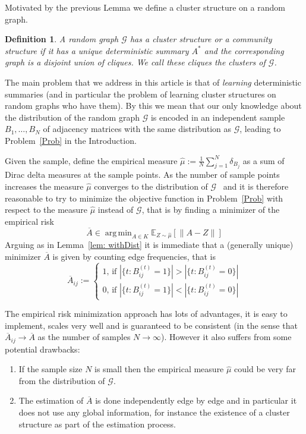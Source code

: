 \documentclass[12pt]{amsart}
\newtheorem{definition}[lemma]{Definition}
\theoremstyle{remark}
\DeclareMathOperator*{\argmin}{arg\,min}
\newcommand{\EE}{\mathbb{E}}
\newcommand{\grG}{{\mathcal{G}}}
\begin{document}
Motivated by the previous Lemma we define a cluster structure on a random graph.

\begin{definition} A random graph $\grG$ has a {\it cluster structure} or a {\it community structure} if it has a unique deterministic summary $A^*$ and the corresponding graph is a disjoint union of cliques. We call these cliques the clusters of $\grG$.
\end{definition}

The main problem that we address in this article is that of {\it learning} deterministic summaries (and in particular the problem of learning cluster structures on random graphs who have them). By this we mean that our only knowledge about the distribution of the random graph $\grG$ is encoded in an independent sample $B_1,\dots, B_N$ of adjacency matrices with the same distribution as $\grG$, leading to Problem~\ref{Prob} in the Introduction. 



Given the sample, define the empirical measure $\hat{\mu}:=\frac{1}{N}\sum_{j=1}^N \delta_{B_j}$ as a sum of Dirac delta measures at the sample points. As the number of sample points increases the measure $\hat{\mu}$ converges to the distribution of $\grG$~\cite{Fournier} and it is therefore reasonable to try to minimize the objective function in Problem~\ref{Prob} with respect to the measure $\hat{\mu}$ instead of $\grG$, that is by finding a minimizer of the empirical risk
\[\overline{A}\in\argmin _{A\in K} \EE_{Z\sim \hat{\mu}}[\|A-Z\|]\]
Arguing as in Lemma~\ref{lem: withDist} it is immediate that a (generally unique) minimizer $\overline{A}$ is given by counting edge frequencies, that is
\[ 
\overline{A}_{ij}:=\begin{cases}
1\text{, if $|\{t: B^{(t)}_{ij}=1\}|>|\{t: B^{(t)}_{ij}=0\}|$}\\
0\text{, if $|\{t: B^{(t)}_{ij}=1\}|<|\{t: B^{(t)}_{ij}=0\}|$}
\end{cases}
\]

The empirical risk minimization approach has lots of advantages, it is easy to implement, scales very well and is guaranteed to be consistent (in the sense that $\overline{A}_{ij}\rightarrow \overline{A}$ as the number of samples $N\rightarrow \infty$). However it also suffers from some potential drawbacks:

\begin{enumerate}
\item If the sample size $N$ is small then the empirical measure $\hat\mu$ could be very far from the distribution of $\grG$.
\item The estimation of $\overline{A}$ is done independently edge by edge and in particular it does not use any global information, for instance the existence of a cluster structure as part of the estimation process.
\end{enumerate}
\end{document}
